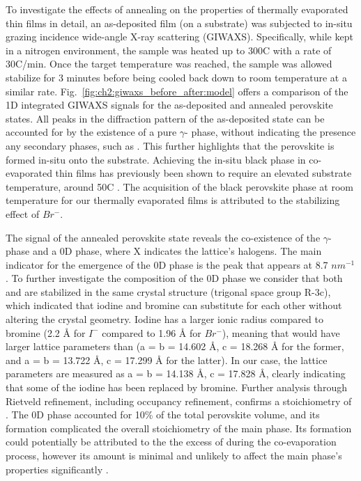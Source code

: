 To investigate the effects of annealing on the properties of thermally evaporated  thin films in detail, an as-deposited film (on a  substrate) was subjected to in-situ grazing incidence wide-angle X-ray scattering (GIWAXS). Specifically, while kept in a nitrogen environment, the sample was heated up to 300\degree C with a rate of 30\degree C/min. Once the target temperature was reached, the sample was allowed stabilize for 3 minutes before being cooled back down to room temperature at a similar rate. Fig.~\ref{fig:ch2:giwaxs_before_after:model} offers a comparison of the 1D integrated GIWAXS signals for the as-deposited and annealed perovskite states. All peaks in the diffraction pattern of the as-deposited state can be accounted for by the existence of a pure $\gamma$- phase, without indicating the presence any secondary phases, such as . This further highlights that the perovskite is formed in-situ onto the substrate. Achieving the in-situ black phase in co-evaporated  thin films has previously been shown to require an elevated substrate temperature, around 50\degree C \cite{Dong2023GrowthFilm, Becker2019LowExperimentation}. The acquisition of the black perovskite phase at room temperature for our thermally evaporated films is attributed to the stabilizing effect of $Br^-$. 

The signal of the annealed perovskite state reveals the co-existence of the $\gamma$- phase and a 0D  phase, where X indicates the lattice's halogens. The main indicator for the emergence of the 0D phase is the peak that appears at 8.7 $nm^{-1}$. To further investigate the composition of the 0D phase we consider that both  and  are stabilized in the same crystal structure (trigonal space group R-3c), which indicated that iodine and bromine can substitute for each other without altering the crystal geometry. Iodine has a larger ionic radius compared to bromine (2.2 {\AA} for $I^-$ compared to 1.96 {\AA} for $Br^-$), meaning that  would have larger lattice parameters than  (a = b = 14.602 {\AA}, c = 18.268 {\AA} for the former, and a = b = 13.722 {\AA}, c = 17.299 {\AA} for the latter)\cite{Bhaumik2020BroadbandNanocrystals,DeBastiani2017InsideCrystals}. In our case, the lattice parameters are measured as a = b = 14.138 {\AA}, c = 17.828 {\AA}, clearly indicating that some of the iodine has been replaced by bromine.  Further analysis through Rietveld refinement, including occupancy refinement, confirms a stoichiometry of . The 0D phase accounted for 10\% of the total perovskite volume, and its formation complicated the overall stoichiometry of the main phase. Its formation could potentially be attributed to the the excess of  during the co-evaporation process, however its amount is minimal and unlikely to affect the main phase's properties significantly \cite{Bai2019AStability}. 

